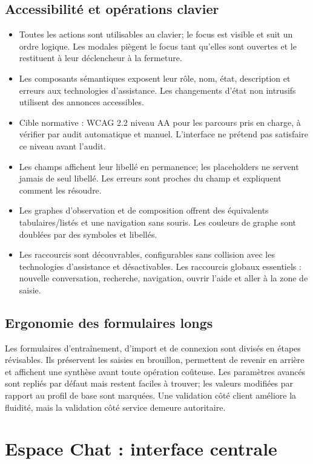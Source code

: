 \documentclass[11pt,a4paper]{article}
\begin{document}
\subsection{Accessibilité et opérations clavier}
\begin{itemize}
\item Toutes les actions sont utilisables au clavier; le focus est visible et suit un ordre logique. Les modales piègent le focus tant qu'elles sont ouvertes et le restituent à leur déclencheur à la fermeture.
\item Les composants sémantiques exposent leur rôle, nom, état, description et erreurs aux technologies d'assistance. Les changements d'état non intrusifs utilisent des annonces accessibles.
\item Cible normative : WCAG 2.2 niveau AA pour les parcours pris en charge, à vérifier par audit automatique et manuel. L'interface ne prétend pas satisfaire ce niveau avant l'audit.
\item Les champs affichent leur libellé en permanence; les placeholders ne servent jamais de seul libellé. Les erreurs sont proches du champ et expliquent comment les résoudre.
\item Les graphes d'observation et de composition offrent des équivalents tabulaires/listés et une navigation sans souris. Les couleurs de graphe sont doublées par des symboles et libellés.
\item Les raccourcis sont découvrables, configurables sans collision avec les technologies d'assistance et désactivables. Les raccourcis globaux essentiels : nouvelle conversation, recherche, navigation, ouvrir l'aide et aller à la zone de saisie.
\end{itemize}

\subsection{Ergonomie des formulaires longs}
Les formulaires d'entraînement, d'import et de connexion sont divisés en étapes révisables. Ils préservent les saisies en brouillon, permettent de revenir en arrière et affichent une synthèse avant toute opération coûteuse. Les paramètres avancés sont repliés par défaut mais restent faciles à trouver; les valeurs modifiées par rapport au profil de base sont marquées. Une validation côté client améliore la fluidité, mais la validation côté service demeure autoritaire.

\section{Espace Chat : interface centrale}
\end{document}
